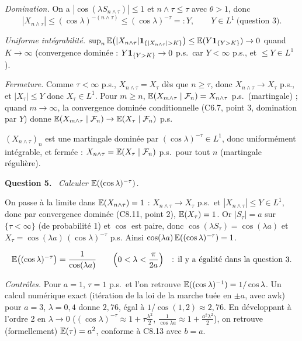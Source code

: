 \documentclass[11pt,a4paper]{article}
\newcommand{\question}[1]{\par\medskip\noindent\textbf{Question #1.}~}
\begin{document}
\begin{exo}[{Martingale trigonométrique et sortie de $]
\emph{Domination.} On a $|\cos(\lambda S_{n\wedge\tau})|\le1$ et $n\wedge\tau\le\tau$ avec $\theta>1$, donc
\[|X_{n\wedge\tau}|\le(\cos\lambda)^{-(n\wedge\tau)}\le(\cos\lambda)^{-\tau}=:Y,\qquad Y\in L^1\ \text{(question 3)}.\]

\emph{Uniforme intégrabilité.} $\sup_n\E\bigl(|X_{n\wedge\tau}|\1_{\{|X_{n\wedge\tau}|>K\}}\bigr)\le\E(Y\1_{\{Y>K\}})\to0$ quand
$K\to\infty$ (convergence dominée : $Y\mathbf{1}_{\{Y>K\}}\to0$ p.s.\ car $Y<\infty$ p.s., et $\le Y\in L^1$).

\emph{Fermeture.} Comme $\tau<\infty$ p.s., $X_{n\wedge\tau}=X_\tau$ dès que $n\ge\tau$, donc $X_{n\wedge\tau}\to X_\tau$ p.s., et
$|X_\tau|\le Y$ donc $X_\tau\in L^1$. Pour $m\ge n$, $\mathbb{E}(X_{m\wedge\tau}\mid\mathcal{F}_n)=X_{n\wedge\tau}$ p.s.\ (martingale) ; quand $m\to\infty$,
la convergence dominée conditionnelle (C6.7, point 3, domination par $Y$) donne $\mathbb{E}(X_{m\wedge\tau}\mid\mathcal{F}_n)\to\mathbb{E}(X_\tau\mid\mathcal{F}_n)$ p.s.
\begin{resultat}
$(X_{n\wedge\tau})_n$ est une martingale dominée par $(\cos\lambda)^{-\tau}\in L^1$, donc uniformément intégrable, et fermée :
$X_{n\wedge\tau}=\mathbb{E}(X_\tau\mid\mathcal{F}_n)$ p.s.\ pour tout $n$ (martingale régulière).
\end{resultat}

\question{5} \emph{Calculer $\mathbb{E}((\cos\lambda)^{-\tau})$.}

On passe à la limite dans $\mathbb{E}(X_{n\wedge\tau})=1$ : $X_{n\wedge\tau}\to X_\tau$ p.s.\ et $|X_{n\wedge\tau}|\le Y\in L^1$, donc par
convergence dominée (C8.11, point 2), $\mathbb{E}(X_\tau)=1$. Or $|S_\tau|=a$ sur $\{\tau<\infty\}$ (de probabilité 1) et $\cos$ est
paire, donc $\cos(\lambda S_\tau)=\cos(\lambda a)$ et $X_\tau=\cos(\lambda a)\,(\cos\lambda)^{-\tau}$ p.s. Ainsi
$\cos(\lambda a)\,\mathbb{E}((\cos\lambda)^{-\tau})=1$.
\begin{resultat}
\[\mathbb{E}\bigl((\cos\lambda)^{-\tau}\bigr)=\frac1{\cos(\lambda a)}\qquad\Bigl(0<\lambda<\frac\pi{2a}\Bigr)\quad\text{: il y a égalité dans la question 3.}\]
\end{resultat}
\emph{Contrôles.} Pour $a=1$, $\tau=1$ p.s.\ et l'on retrouve $\mathbb{E}((\cos\lambda)^{-1})=1/\cos\lambda$. Un calcul numérique exact (itération
de la loi de la marche tuée en $\pm a$, avec awk) pour $a=3$, $\lambda=0{,}4$ donne $2{,}76$, égal à $1/\cos(1{,}2)\approx2{,}76$.
En développant à l'ordre 2 en $\lambda\to0$ ($(\cos\lambda)^{-\tau}\approx1+\tau\frac{\lambda^2}2$, $\frac1{\cos\lambda a}\approx1+\frac{a^2\lambda^2}2$),
on retrouve (formellement) $\mathbb{E}(\tau)=a^2$, conforme à C8.13 avec $b=a$.


\end{exo}
\end{document}
